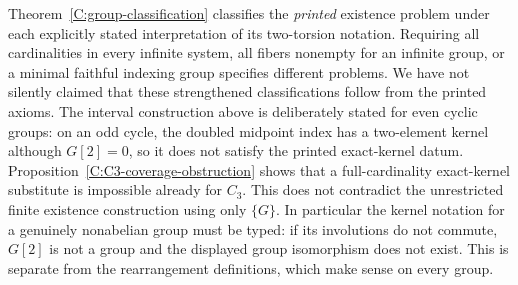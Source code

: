 \begin{remark}
\label{C:classification-scope}
Theorem~\ref{C:group-classification} classifies the \emph{printed} existence problem under each explicitly stated interpretation of its two-torsion notation. Requiring all cardinalities in every infinite system, all fibers nonempty for an infinite group, or a minimal faithful indexing group specifies different problems. We have not silently claimed that these strengthened classifications follow from the printed axioms. The interval construction above is deliberately stated for even cyclic groups: on an odd cycle, the doubled midpoint index has a two-element kernel although $G[2]=0$, so it does not satisfy the printed exact-kernel datum. Proposition~\ref{C:C3-coverage-obstruction} shows that a full-cardinality exact-kernel substitute is impossible already for $C_3$. This does not contradict the unrestricted finite existence construction using only $\{G\}$. In particular the kernel notation for a genuinely nonabelian group must be typed: if its involutions do not commute, $G[2]$ is not a group and the displayed group isomorphism does not exist. This is separate from the rearrangement definitions, which make sense on every group.
\end{remark}

